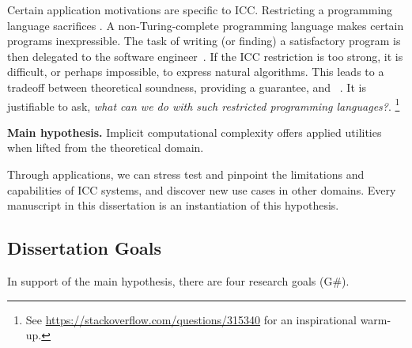 Certain application motivations are specific to ICC\@.
Restricting a programming language sacrifices .
A non-Turing-complete programming language makes certain programs inexpressible.
The task of writing (or finding) a satisfactory program is then delegated to the software engineer~\cite[p. 14]{moyen2017}.
If the ICC restriction is too strong, it is difficult, or perhaps impossible, to express natural algorithms.
This leads to a tradeoff between theoretical soundness, \ie providing a guarantee, and ~\cite{feree2018}.
It is justifiable to ask, \emph{what can we do with such restricted programming languages?}.%
\footnote{See \url{https://stackoverflow.com/questions/315340} for an inspirational warm-up.}

\begin{infobox}
\textbf{Main hypothesis.}
Implicit computational complexity offers applied utilities when lifted from the
theoretical domain.
\end{infobox}

Through applications, we can stress test and pinpoint the limitations and capabilities of ICC systems, and discover new use cases in other domains.
Every manuscript in this dissertation is an instantiation of this hypothesis.


\subsection{Dissertation Goals}\label{subsec:specific-aims}

In support of the main hypothesis, there are four research goals (G\#).


